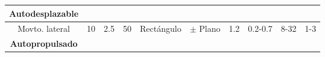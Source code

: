 \begin{table}[h!]
\begin{turn}{90}
\begin{tabular}{c|c|c|c|c|c|c|c|c|c}
			\multicolumn{1}{|c|}{\textbf{Autodesplazable}}                                   & \multicolumn{1}{c|}{}                                                                     & \multicolumn{1}{c|}{}                                                                  & \multicolumn{1}{c|}{}    & \multicolumn{1}{c|}{}                                                            & \multicolumn{1}{c|}{}                                                               & \multicolumn{1}{c|}{}                                                                  & \multicolumn{1}{c|}{}                                                              & \multicolumn{1}{c|}{}                                                             & \multicolumn{1}{c|}{}                                                                     \\ \midrule
			\multicolumn{1}{|c|}{Movto. lateral}                                             & \multicolumn{1}{c|}{10}                                                                   & \multicolumn{1}{c|}{2.5}                                                               & \multicolumn{1}{c|}{50}  & \multicolumn{1}{c|}{Rectángulo}                                                  & \multicolumn{1}{c|}{$\pm$ Plano}                                                    & \multicolumn{1}{c|}{1.2}                                                               & \multicolumn{1}{c|}{0.2-0.7}                                                       & \multicolumn{1}{c|}{8-32}                                                         & \multicolumn{1}{c|}{1-3}                                                                  \\ \midrule
			\multicolumn{1}{|c|}{\textbf{Autopropulsado}}                                    & \multicolumn{1}{c|}{}                                                                     & \multicolumn{1}{c|}{}                                                                  & \multicolumn{1}{c|}{}    & \multicolumn{1}{c|}{}                                                            & \multicolumn{1}{c|}{}                                                               & \multicolumn{1}{c|}{}                                                                  & \multicolumn{1}{c|}{}                                                              & \multicolumn{1}{c|}{}                                                             & \multicolumn{1}{c|}{}                                                                     \\ \midrule

\end{tabular}
\end{turn}
\end{table}
